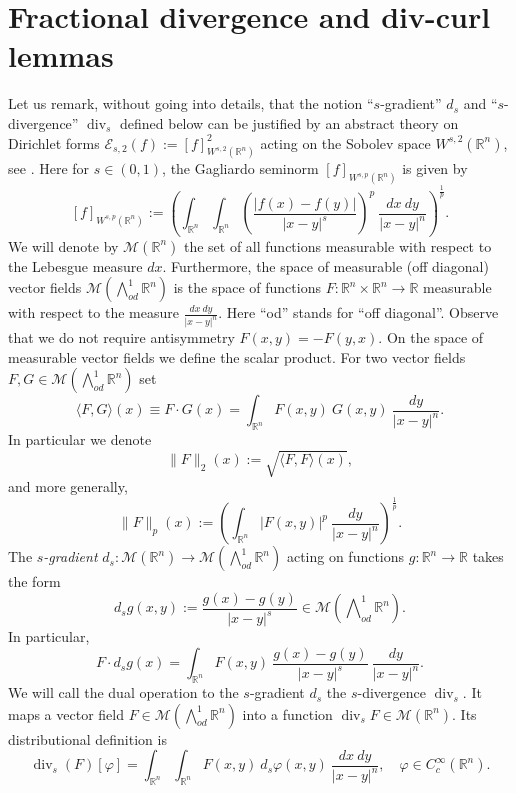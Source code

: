 \documentclass[12pt]{amsart}
\theoremstyle{definition}
\newcommand{\R}{\mathbb{R}}
\newcommand{\brac}[1]{\left (#1 \right )}
\newcommand{\Ep}{\bigwedge\nolimits}
\numberwithin{theorem}{section} \numberwithin{equation}{section}
\renewcommand{\div}{\operatorname{div}}
\begin{document}
\section{Fractional divergence and div-curl lemmas}\label{s:fracclms}
Let us remark, without going into details, that the notion ``$s$-gradient'' $d_s$ and ``$s$-divergence'' $\div_s$ defined below can be justified by an abstract theory on Dirichlet forms $\mathcal{E}_{s,2}(f) := [f]_{W^{s,2}(\R^n)}^2$ acting on the Sobolev space $W^{s,2}(\R^n)$, see \cite[Examples 4.1]{Hinz-2015}. Here for $s \in (0,1)$, the Gagliardo seminorm $[f]_{W^{s,p}(\R^n)}$ is given by
\[
 [f]_{W^{s,p}(\R^n)} := \brac{ \int_{\R^n}\int_{\R^n}\brac{\frac{|f(x)-f(y)|}{|x-y|^{s}}}^p\ \frac{dx\ dy}{|x-y|^n}}^{\frac{1}{p}}.
\]
We will denote by $\mathcal{M}(\R^n)$ the set of all functions measurable with respect to the Lebesgue measure $dx$. Furthermore, the space of measurable (off diagonal) vector fields $\mathcal{M}(\Ep^1_{od} \R^n)$ is the space of functions $F: \R^n \times \R^n \to \R$ measurable with respect to the measure $\frac{dx\ dy}{|x-y|^{n}}$. Here ``od'' stands for ``off diagonal''. Observe that we do not require antisymmetry $F(x,y) = -F(y,x)$. On the space of measurable vector fields we define the scalar product. For two vector fields $F,G \in \mathcal{M}(\Ep^1_{od} \R^n )$  set
\[
 \langle F,G \rangle(x) \equiv F \cdot G(x) = \int_{\R^n} F(x,y)\ G(x,y)\ \frac{dy}{|x-y|^{n}}.
\]
In particular we denote
\[
 \|F\|_{2}(x) := \sqrt{\langle F,F \rangle(x)},
\]
and more generally,  
\[
 \|F\|_{p}(x) :=\brac{\int_{\R^n} |F(x,y)|^p\ \frac{dy}{|x-y|^{n}}}^{\frac{1}{p}}.
\]
% 
% 
% 
The \emph{$s$-gradient} $d_s: \mathcal{M}(\R^n) \to \mathcal{M}(\Ep^1_{od} \R^n)$ acting on functions $g: \R^n \to \R$ takes the form
\[
 d_s g(x,y) := \frac{g(x)-g(y)}{|x-y|^s} \in \mathcal{M}\brac{\Ep^1_{od}\R^n}.
\]
In particular,
\[
 F \cdot d_s g(x) = \int_{\R^n} F(x,y)\ \frac{g(x)-g(y)}{|x-y|^s}\ \frac{dy}{|x-y|^n}.
\]
We will call the dual operation to the $s$-gradient $d_s$ the $s$-divergence $\div_s$. It maps a vector field $F \in \mathcal{M}(\Ep^1_{od}\R^n)$ into a function $\div_s F \in \mathcal{M}(\R^n)$. Its distributional definition is
\begin{equation}\label{eq:divs}
 \div_s(F)[\varphi] = \int_{\R^n} \int_{\R^n} F(x,y)\ d_s \varphi(x,y)\ \frac{dx\ dy}{|x-y|^n}, \quad \varphi \in C_c^\infty(\R^n).
\end{equation}
\end{document}
